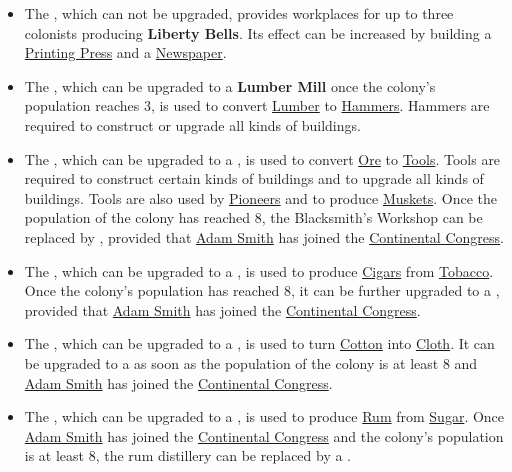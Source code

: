 \documentclass[12pt]{article}
\begin{document}
\begin{itemize}
\item The , which can not be upgraded, provides
  workplaces for up to three colonists producing \textbf{Liberty
  Bells}. Its effect can be increased by building a
  \hyperlink{Printing Press}{Printing Press} and a
  \hyperlink{Newspaper}{Newspaper}.

\item The , which can be upgraded to a
  \textbf{Lumber Mill} once the colony's population reaches 3, is used
  to convert \hyperlink{Lumber}{Lumber} to
  \hyperlink{Hammers}{Hammers}. Hammers are required to construct or
  upgrade all kinds of buildings.

\item The , which can be upgraded to a
  , is used to convert
  \hyperlink{Ore}{Ore} to \hyperlink{Tools}{Tools}. Tools are required
  to construct certain kinds of buildings and to upgrade all kinds of
  buildings. Tools are also used by \hyperlink{Pioneer}{Pioneers} and
  to produce \hyperlink{Muskets}{Muskets}. Once the population of the
  colony has reached 8, the Blacksmith's Workshop can be replaced by
  , provided that \hyperlink{Adam Smith}{Adam
  Smith} has joined the \hyperlink{Continental Congress}{Continental
  Congress}.

\item The , which can be upgraded to a
  , is used to produce
  \hyperlink{Cigars}{Cigars} from \hyperlink{Tobacco}{Tobacco}.  Once
  the colony's population has reached 8, it can be further upgraded to
  a , provided that \hyperlink{Adam
  Smith}{Adam Smith} has joined the \hyperlink{Continental
  Congress}{Continental Congress}.

\item The , which can be upgraded to a
  , is used to turn \hyperlink{Cotton}{Cotton}
  into \hyperlink{Cloth}{Cloth}. It can be upgraded to a
   as soon as the population of the colony is
  at least 8 and \hyperlink{Adam Smith}{Adam Smith} has joined the
  \hyperlink{Continental Congress}{Continental Congress}.

\item The , which can be upgraded to a
  , is used to produce \hyperlink{Rum}{Rum}
  from \hyperlink{Sugar}{Sugar}. Once \hyperlink{Adam Smith}{Adam
  Smith} has joined the \hyperlink{Continental Congress}{Continental
  Congress} and the colony's population is at least 8, the rum
  distillery can be replaced by a .


\end{itemize}
\end{document}
